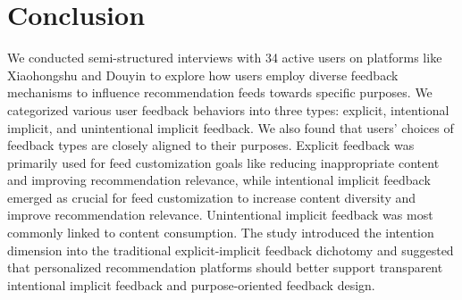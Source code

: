\section{Conclusion}


We conducted semi-structured interviews with 34 active users on platforms like Xiaohongshu and Douyin to explore how users employ diverse feedback mechanisms to influence recommendation feeds towards specific purposes. We categorized various user feedback behaviors into three types: explicit, intentional implicit, and unintentional implicit feedback. We also found that users' choices of feedback types are closely aligned to their purposes. Explicit feedback was primarily used for feed customization goals like reducing inappropriate content and improving recommendation relevance, while intentional implicit feedback emerged as crucial for feed customization to increase content diversity and improve recommendation relevance. Unintentional implicit feedback was most commonly linked to content consumption. The study introduced the intention dimension into the traditional explicit-implicit feedback dichotomy and suggested that personalized recommendation platforms should better support transparent intentional implicit feedback and purpose-oriented feedback design.